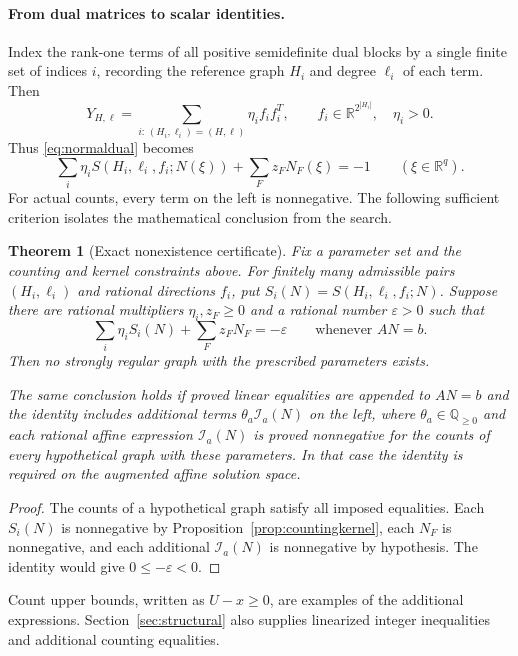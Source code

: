 \documentclass[11pt]{article}
\newtheorem{theorem}{Theorem}[section]
\theoremstyle{remark}
\newcommand{\R}{\mathbb R}
\newcommand{\Q}{\mathbb Q}
\numberwithin{equation}{section}
\begin{document}
\paragraph{From dual matrices to scalar identities.}
Index the rank-one terms of all positive semidefinite dual blocks by
a single finite set of indices $i$, recording the reference graph
$H_i$ and degree $\ell_i$ of each term. Then
\[
 Y_{H,\ell}=\sum_{i:\,(H_i,\ell_i)=(H,\ell)}\eta_i f_if_i^T,
 \qquad f_i\in\R^{2^{|H_i|}},\quad\eta_i>0.
\]
Thus \eqref{eq:normaldual} becomes
\begin{equation}\label{eq:certificate}
 \boxed{\displaystyle
 \sum_i\eta_iS(H_i,\ell_i,f_i;N(\xi))+
 \sum_Fz_FN_F(\xi)=-1\qquad(\xi\in\R^q).}
\end{equation}
For actual counts, every term on the left is nonnegative. The following
sufficient criterion isolates the mathematical conclusion from the search.

\begin{theorem}[Exact nonexistence certificate]\label{thm:exact-certificate}
Fix a parameter set and the counting and kernel constraints above.
For finitely many admissible pairs $(H_i,\ell_i)$ and rational
directions $f_i$, put $S_i(N)=S(H_i,\ell_i,f_i;N)$.
Suppose there are rational multipliers $\eta_i,z_F\ge0$ and a rational
number $\varepsilon>0$ such that
\begin{equation}\label{eq:exact-certificate-theorem}
 \sum_i\eta_iS_i(N)+\sum_Fz_FN_F=-\varepsilon
 \qquad\text{whenever }AN=b.
\end{equation}
Then no strongly regular graph with the prescribed parameters exists.

The same conclusion holds if proved linear equalities are appended to
$AN=b$ and the identity includes additional terms
$\theta_a\mathcal I_a(N)$ on the left, where $\theta_a\in\Q_{\ge0}$
and each rational affine expression $\mathcal I_a(N)$ is proved
nonnegative for the counts of every hypothetical graph with these
parameters. In that case the identity is required on the augmented
affine solution space.
\end{theorem}
\begin{proof}
The counts of a hypothetical graph satisfy all imposed equalities.
Each $S_i(N)$ is nonnegative by Proposition~\ref{prop:countingkernel},
each $N_F$ is nonnegative, and each additional $\mathcal I_a(N)$ is
nonnegative by hypothesis. The identity would give
$0\le-\varepsilon<0$.
\end{proof}
Count upper bounds, written as $U-x\ge0$, are examples of the
additional expressions. Section~\ref{sec:structural} also supplies
linearized integer inequalities and additional counting equalities.
\end{document}
